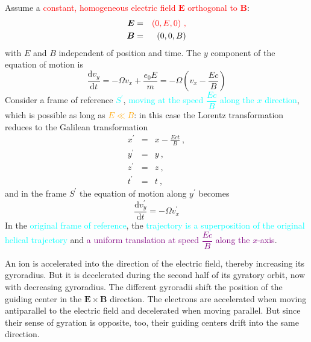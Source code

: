\documentclass[12pt,a4paper]{article}
\renewcommand{\vec}[1]{\boldsymbol{#1}}
\newcommand{\dif}{\mathrm{d}}
\begin{document}
\cite{2015bps..book.....C} Assume a \textcolor{red}{constant, homogeneous electric field $\vec{E}$ orthogonal to $\vec{B}$}:
\begin{eqnarray*}
\vec{E} &=& \color{red} (0, E, 0) ~,\\
\vec{B} &=& (0, 0, B)
\end{eqnarray*}
with $E$ and $B$ independent of position and time. The $y$ component of the equation of motion is
\begin{equation*}
\frac{\dif v_y}{\dif t} = -\Omega v_x + \frac{e_0 E}{m} = -\Omega \left(v_x -\frac{Ec}{B} \right)
\end{equation*}
Consider a frame of reference \textcolor{cyan}{$S^\prime$}, \textcolor{cyan}{moving at the speed $\dfrac{Ec}{B}$ along the $x$ direction}, which is possible as long as \textcolor{orange}{$E \ll B$}: in this case the Lorentz transformation reduces to the Galilean transformation
\begin{eqnarray*}
x^\prime &=& x -\frac{Ect}{B} ~, \\
y^\prime &=& y ~,\\
z^\prime &=& z ~, \\
t^\prime &=& t ~,
\end{eqnarray*}
and in the frame $S^\prime$ the equation of motion along $y^\prime$ becomes
\begin{equation}
\frac{\dif v^\prime_y}{\dif t} = -\Omega v^\prime_x 
\end{equation}
In the \textcolor{cyan}{original frame of reference}, the \textcolor{cyan}{trajectory is a superposition of the original helical trajectory} and \textcolor{purple}{a uniform translation at speed $\dfrac{Ec}{B}$ along the $x$-axis}. 

\cite{1996bspp.book.....B} An ion is accelerated into the direction of the electric field, thereby increasing its gyroradius. But it is decelerated during the second half of its gyratory orbit, now with decreasing gyroradius. The different gyroradii shift the position of the guiding center in the $\vec{E} \times \vec{B}$ direction. The electrons are accelerated when moving antiparallel to the electric field and decelerated when moving parallel. But since their sense of gyration is opposite, too, their guiding centers drift into the same direction.
\end{document}

